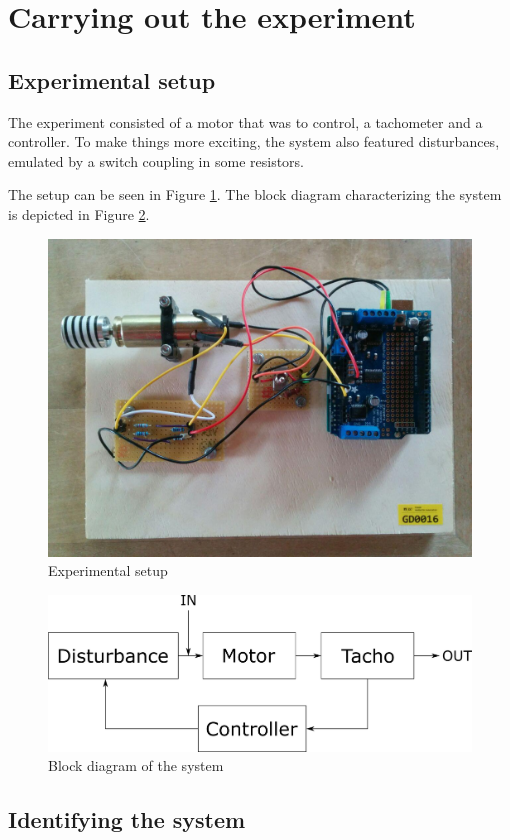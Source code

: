 \section{Carrying out the experiment}

\subsection{Experimental setup}

The experiment consisted of a motor that was to control, a tachometer and a controller. To make things more exciting, the system also featured disturbances, emulated by a switch coupling in some resistors.

The setup can be seen in Figure \ref{fig:setup}. The block diagram characterizing the system is depicted in Figure \ref{fig:blockdiagram}.

\begin{figure}[H]
\begin{center}
\includegraphics[width=0.6\linewidth]{images/general/setup}
\end{center}
\caption{Experimental setup}
\label{fig:setup}
\end{figure}

\begin{figure}[H]
\begin{center}
\includegraphics[width=0.6\linewidth]{images/general/motor_system}
\end{center}
\caption{Block diagram of the system}
\label{fig:blockdiagram}
\end{figure}

\subsection{Identifying the system}

